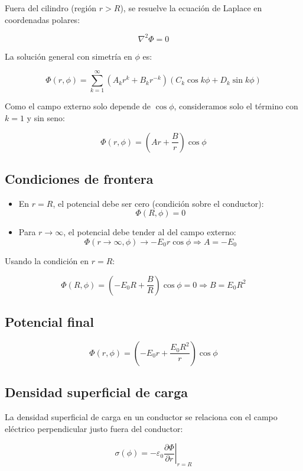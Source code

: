 \documentclass[12pt]{article}
\begin{document}
Fuera del cilindro (región \( r > R \)), se resuelve la ecuación de Laplace en coordenadas polares:

\[
\nabla^2 \Phi = 0
\]

La solución general con simetría en \( \phi \) es:

\[
\Phi(r, \phi) = \sum_{k=1}^{\infty} \left( A_k r^k + B_k r^{-k} \right)(C_k \cos k\phi + D_k \sin k\phi)
\]

Como el campo externo solo depende de \( \cos \phi \), consideramos solo el término con \( k = 1 \) y sin seno:

\[
\Phi(r, \phi) = \left( A r + \frac{B}{r} \right) \cos \phi
\]

\subsection*{Condiciones de frontera}

\begin{itemize}
    \item En \( r = R \), el potencial debe ser cero (condición sobre el conductor):
    \[
    \Phi(R, \phi) = 0
    \]
    
    \item Para \( r \to \infty \), el potencial debe tender al del campo externo:
    \[
    \Phi(r \to \infty, \phi) \to -E_0 r \cos \phi
    \Rightarrow A = -E_0
    \]
\end{itemize}

Usando la condición en \( r = R \):

\[
\Phi(R, \phi) = \left( -E_0 R + \frac{B}{R} \right) \cos \phi = 0
\Rightarrow B = E_0 R^2
\]

\subsection*{Potencial final}

\[
\Phi(r, \phi) = \left( -E_0 r + \frac{E_0 R^2}{r} \right) \cos \phi
\]

\subsection*{Densidad superficial de carga}

La densidad superficial de carga en un conductor se relaciona con el campo eléctrico perpendicular justo fuera del conductor:

\[
\sigma(\phi) = -\varepsilon_0 \left. \frac{\partial \Phi}{\partial r} \right|_{r = R}
\]
\end{document}
